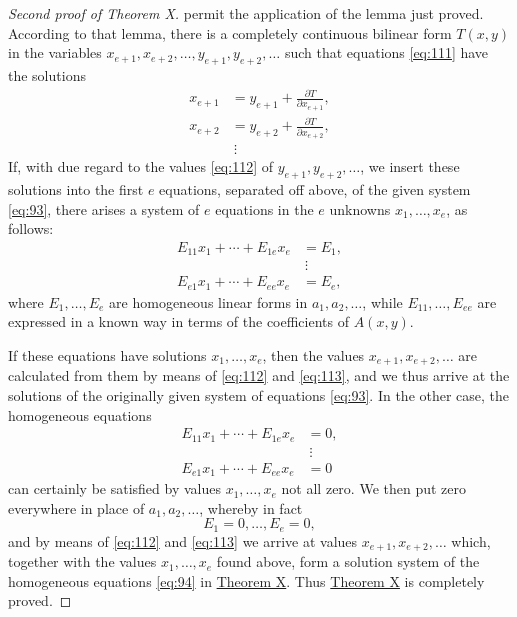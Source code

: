 \documentclass[b5paper,twoside]{article}
\newcommand{\originalpage}[1]{\phantomsection\label{origpage:#1}}
\begin{document}
\begin{proof}[Second proof of Theorem X]
permit the application of the lemma just proved. According to that lemma,
there is a completely continuous bilinear form $T(x,y)$ in the variables
$x_{e+1},x_{e+2},\ldots,y_{e+1},y_{e+2},\ldots$ such that equations
\eqref{eq:111} have the solutions
\begin{equation}
  \begin{aligned}
    x_{e+1}&=y_{e+1}+\frac{\partial T}{\partial x_{e+1}},\\
    x_{e+2}&=y_{e+2}+\frac{\partial T}{\partial x_{e+2}},\\
    &\ \vdots
  \end{aligned}
  \tag{113}\label{eq:113}
\end{equation}
If, with due regard to the values \eqref{eq:112} of
$y_{e+1},y_{e+2},\ldots$, we insert these solutions into the first $e$
equations, separated off above, of the given system \eqref{eq:93}, there
arises a system of $e$ equations in the $e$ unknowns $x_1,\ldots,x_e$, as
follows:
\begin{equation}
  \begin{aligned}
    E_{11}x_1+\cdots+E_{1e}x_e&=E_1,\\
    &\ \vdots\\
    E_{e1}x_1+\cdots+E_{ee}x_e&=E_e,
  \end{aligned}
  \tag{114}\label{eq:114}
\end{equation}
where $E_1,\ldots,E_e$ are homogeneous linear forms in
$a_1,a_2,\ldots$, while $E_{11},\ldots,E_{ee}$ are expressed in a known way
in terms of the coefficients of $A(x,y)$.

If these equations have solutions $x_1,\ldots,x_e$, then the values
$x_{e+1},x_{e+2},\ldots$ are calculated from them by means of
\eqref{eq:112} and \eqref{eq:113}, and we thus arrive at the solutions of the
originally given system of equations \eqref{eq:93}. In the other case, the
homogeneous equations
\begin{align*}
  E_{11}x_1+\cdots+E_{1e}x_e&=0,\\
  &\ \vdots\\
  E_{e1}x_1+\cdots+E_{ee}x_e&=0
\end{align*}
can certainly be satisfied by values $x_1,\ldots,x_e$ not all zero. We then
put zero everywhere in place of $a_1,a_2,\ldots$, whereby in fact
\[
  E_1=0,\ldots,E_e=0,
\]
and by means of \eqref{eq:112} and \eqref{eq:113} we arrive at values
$x_{e+1},x_{e+2},\ldots$ which, together with the values
$x_1,\ldots,x_e$ found above, form a
\originalpage{227}
solution system of the homogeneous equations \eqref{eq:94} in
\hyperref[thm:X]{Theorem X}. Thus \hyperref[thm:X]{Theorem X} is completely
proved.
\end{proof}
\end{document}
